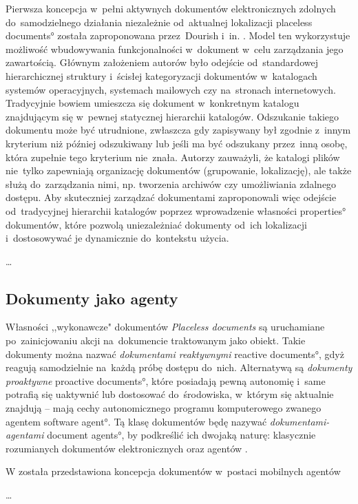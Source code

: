Pierwsza koncepcja w~pełni aktywnych dokumentów elektronicznych zdolnych do~samodzielnego działania niezależnie od~aktualnej lokalizacji \ang{placeless documents} została zaproponowana przez~Dourish i~in. \cite{Dourish2000, Dourish2003}. Model ten wykorzystuje możliwość wbudowywania funkcjonalności w~dokument w~celu zarządzania jego zawartością. Głównym założeniem autorów było odejście od~standardowej hierarchicznej struktury i~ścisłej kategoryzacji dokumentów w~katalogach systemów operacyjnych, systemach mailowych czy na~stronach internetowych. Tradycyjnie bowiem umieszcza się dokument w~konkretnym katalogu znajdującym się w~pewnej statycznej hierarchii katalogów. Odszukanie takiego dokumentu może być utrudnione, zwłaszcza gdy zapisywany był zgodnie z~innym kryterium niż później odszukiwany lub jeśli ma być odszukany przez~inną osobę, która zupełnie tego kryterium nie~znała. Autorzy zauważyli, że katalogi plików nie~tylko zapewniają organizację dokumentów (grupowanie, lokalizację), ale także służą do~zarządzania nimi, np. tworzenia archiwów czy umożliwiania zdalnego dostępu. Aby skuteczniej zarządzać dokumentami zaproponowali więc odejście od~tradycyjnej hierarchii katalogów poprzez wprowadzenie własności \ang{properties} dokumentów, które pozwolą uniezależniać dokumenty od~ich lokalizacji i~dostosowywać je dynamicznie do~kontekstu użycia. 

\dots

\subsection{Dokumenty jako agenty}
\label{sec:DokumentyAgentowe}
Własności ,,wykonawcze" dokumentów \emph{Placeless documents} są uruchamiane po~zainicjowaniu akcji na~dokumencie traktowanym jako obiekt. Takie dokumenty można nazwać \emph{dokumentami reaktywnymi} \ang{reactive documents}, gdyż reagują samodzielnie na~każdą próbę dostępu do~nich. Alternatywą są \emph{dokumenty proaktywne} \ang{proactive documents}, które posiadają pewną autonomię i~same potrafią się uaktywnić lub dostosować do~środowiska, w~którym się aktualnie znajdują -- mają cechy autonomicznego programu komputerowego zwanego agentem \ang{software agent}. Tą klasę dokumentów będę nazywać \emph{dokumentami-agentami} \ang{document agents}, by podkreślić ich dwojaką naturę: klasycznie rozumianych dokumentów elektronicznych oraz agentów \cite{Ciancarini2002}.

W \cite{Satoh2001} została przedstawiona koncepcja dokumentów w~postaci mobilnych agentów

\dots